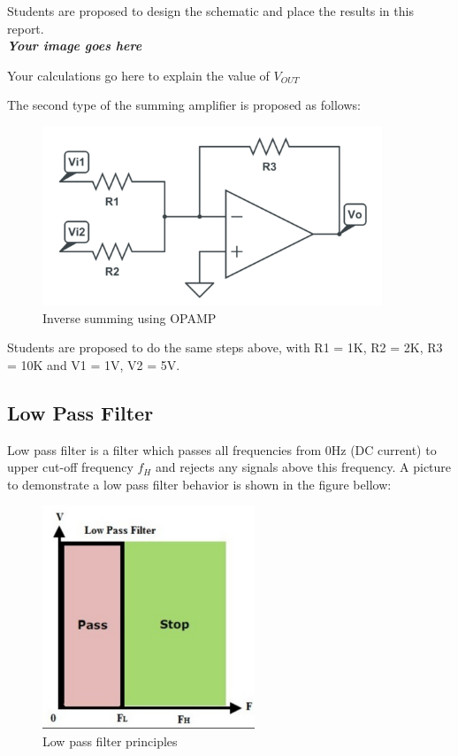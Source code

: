 Students are proposed to design the schematic and place the results in this report.\\

\textbf{\textit{Your image goes here}}

Your calculations go here to explain the value of $V_{OUT}$

The second type of the summing amplifier is proposed as follows:
\begin{figure}[!htp]
    \centering
    \includegraphics[width = 4in]{source/picture/bai_5/inv_sum.png}
    \caption{Inverse summing using OPAMP}
    \label{lab05_opamp_non_inv_sum}
\end{figure}

Students are proposed to do the same steps above, with R1 = 1K, R2 = 2K, R3 = 10K and V1 = 1V, V2 = 5V.

\subsection{Low Pass Filter}
Low pass filter is a filter which passes all frequencies from 0Hz (DC current) to upper cut-off frequency $f_H$ and rejects any signals above this frequency. A picture to demonstrate a low pass filter behavior is shown in the figure bellow:

\begin{figure}[!htp]
    \centering
    \includegraphics[width = 2.5in]{source/picture/bai_5/low_filter1.PNG}
    \caption{Low pass filter principles}
    \label{lab05_low_filter1}
\end{figure}

